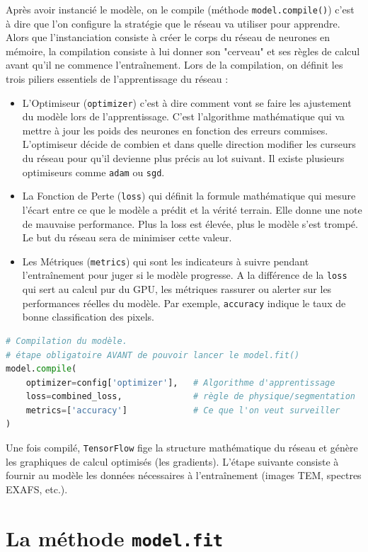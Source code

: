 \documentclass[12pt,a4paper,french]{book}
\begin{document}
Après avoir instancié le modèle, on le compile (méthode \verb+model.compile()+) c'est à dire que l'on configure la stratégie que le réseau va utiliser pour apprendre.
Alors que l'instanciation consiste à créer le corps du réseau de neurones en mémoire, la compilation consiste à lui donner son "cerveau" et ses règles de calcul avant qu'il ne commence l'entraînement.
Lors de la compilation, on définit les trois piliers essentiels de l'apprentissage du réseau :
\begin{itemize}
	\item L'Optimiseur (\verb+optimizer+) c'est à dire comment vont se faire les ajustement du modèle lors de l'apprentissage. C'est l'algorithme mathématique qui va mettre à jour les poids des neurones en fonction des erreurs commises. L'optimiseur décide de combien et dans quelle direction modifier les curseurs du réseau pour qu'il devienne plus précis au lot suivant. Il existe plusieurs optimiseurs comme \verb+adam+ ou \verb+sgd+.
	\item La Fonction de Perte (\verb+loss+) qui définit la formule mathématique qui mesure l'écart entre ce que le modèle a prédit et la vérité terrain. Elle donne une note de mauvaise performance. Plus la loss est élevée, plus le modèle s'est trompé. Le but du réseau sera de minimiser cette valeur.
	\item Les Métriques (\verb+metrics+) qui sont les indicateurs à suivre pendant l'entraînement pour juger si le modèle progresse. A la différence de la \verb+loss+ qui sert au calcul pur du GPU, les métriques rassurer ou alerter sur les performances réelles du modèle. Par exemple, \verb+accuracy+ indique le taux de bonne classification des pixels.
\end{itemize}
\begin{lstlisting}[language=python]
# Compilation du modèle. 
# étape obligatoire AVANT de pouvoir lancer le model.fit()
model.compile(
	optimizer=config['optimizer'],   # Algorithme d'apprentissage
	loss=combined_loss,              # règle de physique/segmentation
	metrics=['accuracy']             # Ce que l'on veut surveiller
)
\end{lstlisting}

Une fois compilé, \verb+TensorFlow+ fige la structure mathématique du réseau et génère les graphiques de calcul optimisés (les gradients). 
L'étape suivante consiste à fournir au modèle les données nécessaires à l'entraînement (images TEM, spectres EXAFS, etc.).


\cprotect\section{La méthode \verb+model.fit+}
\end{document}
